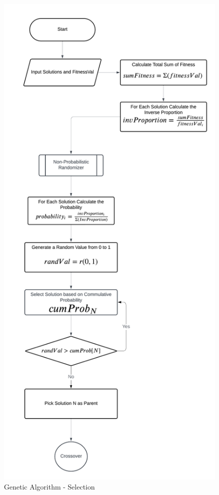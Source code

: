 \begin{appendices}
\begin{centerappendixtitle}
		\begin{figure}[h]
			\centering
			\caption{Genetic Algorithm - Selection}
			\label{selectFlow}
			\includegraphics[width=\textwidth,height=\textheight,keepaspectratio]{appendix/select f}
		\end{figure}
		

\end{centerappendixtitle}
\end{appendices}
